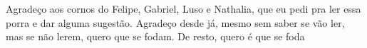 \begin{agradecimentos}







Agradeço aos cornos do Felipe, Gabriel, Luso e Nathalia, que eu pedi pra ler essa porra e dar alguma sugestão. Agradeço desde já, mesmo sem saber se vão ler, mas se não lerem, quero que se fodam. 
De resto, quero é que se foda
\end{agradecimentos}
